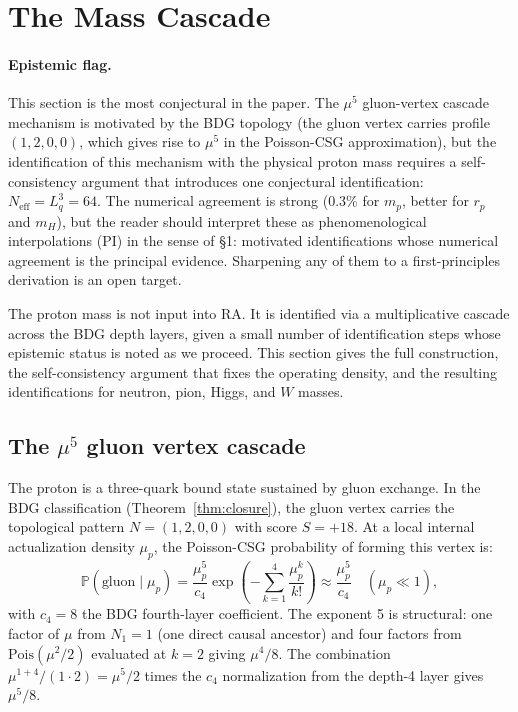 \documentclass[11pt]{article}
\begin{document}
\section{The Mass Cascade}
\label{sec:cascade}

\paragraph{Epistemic flag.} This section is the most conjectural in the paper. The $\mu^5$ gluon-vertex cascade mechanism is motivated by the BDG topology (the gluon vertex carries profile $(1,2,0,0)$, which gives rise to $\mu^5$ in the Poisson-CSG approximation), but the identification of this mechanism with the physical proton mass requires a self-consistency argument that introduces one conjectural identification: $N_{\mathrm{eff}}=L_q^3=64$. The numerical agreement is strong ($0.3\%$ for $m_p$, better for $r_p$ and $m_H$), but the reader should interpret these as phenomenological interpolations (PI) in the sense of \S1: motivated identifications whose numerical agreement is the principal evidence. Sharpening any of them to a first-principles derivation is an open target.

The proton mass is not input into RA. It is identified via a multiplicative cascade across the BDG depth layers, given a small number of identification steps whose epistemic status is noted as we proceed. This section gives the full construction, the self-consistency argument that fixes the operating density, and the resulting identifications for neutron, pion, Higgs, and $W$ masses.

\subsection{The $\mu^5$ gluon vertex cascade}

The proton is a three-quark bound state sustained by gluon exchange. In the BDG classification (Theorem~\ref{thm:closure}), the gluon vertex carries the topological pattern $N=(1,2,0,0)$ with score $S=+18$. At a local internal actualization density $\mu_p$, the Poisson-CSG probability of forming this vertex is:
\begin{equation}
\mathbb{P}(\text{gluon}\mid\mu_p) = \frac{\mu_p^5}{c_4}\exp\!\left(-\sum_{k=1}^{4}\frac{\mu_p^k}{k!}\right) \approx \frac{\mu_p^5}{c_4}\quad(\mu_p\ll 1),
\end{equation}
with $c_4=8$ the BDG fourth-layer coefficient. The exponent 5 is structural: one factor of $\mu$ from $N_1=1$ (one direct causal ancestor) and four factors from $\mathrm{Pois}(\mu^2/2)$ evaluated at $k=2$ giving $\mu^4/8$. The combination $\mu^{1+4}/(1\cdot 2)=\mu^5/2$ times the $c_4$ normalization from the depth-4 layer gives $\mu^5/8$.
\end{document}
